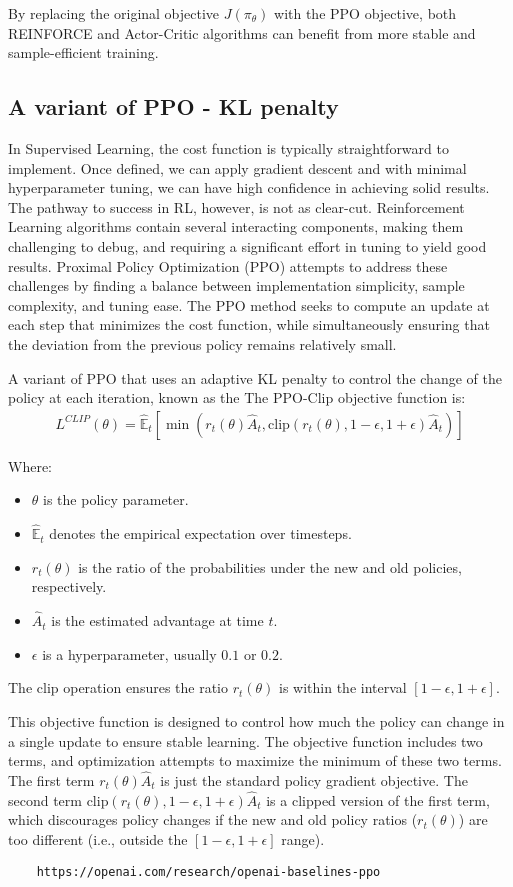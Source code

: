 By replacing the original objective $J(\pi_{\theta})$ with the PPO objective, both REINFORCE and Actor-Critic algorithms can benefit from more stable and sample-efficient training.

\subsection{A variant of PPO - KL penalty }
In Supervised Learning, the cost function is typically straightforward to implement. Once defined, we can apply gradient descent and with minimal hyperparameter tuning, we can have high confidence in achieving solid results. The pathway to success in RL, however, is not as clear-cut. Reinforcement Learning algorithms contain several interacting components, making them challenging to debug, and requiring a significant effort in tuning to yield good results. Proximal Policy Optimization (PPO) attempts to address these challenges by finding a balance between implementation simplicity, sample complexity, and tuning ease. The PPO method seeks to compute an update at each step that minimizes the cost function, while simultaneously ensuring that the deviation from the previous policy remains relatively small.

A variant of PPO that uses an adaptive KL penalty to control the change of the policy at each iteration, known as the The PPO-Clip objective function is:
\begin{align*}
L^{CLIP}(\theta) = \hat{\mathbb{E}}_t \left[ \min \left( r_t(\theta) \hat{A}_t, \text{clip}(r_t(\theta), 1-\epsilon, 1+\epsilon) \hat{A}_t \right) \right]
\end{align*}

Where:
\begin{itemize}
    \item $\theta$ is the policy parameter.
    \item $\hat{\mathbb{E}}_t$ denotes the empirical expectation over timesteps.
    \item $r_t(\theta)$ is the ratio of the probabilities under the new and old policies, respectively.
    \item $\hat{A}_t$ is the estimated advantage at time $t$.
    \item $\epsilon$ is a hyperparameter, usually $0.1$ or $0.2$.
\end{itemize}
The clip operation ensures the ratio $r_t(\theta)$ is within the interval $[1-\epsilon, 1+\epsilon]$.

This objective function is designed to control how much the policy can change in a single update to ensure stable learning. The objective function includes two terms, and optimization attempts to maximize the minimum of these two terms. The first term $r_t(\theta) \hat{A}_t$ is just the standard policy gradient objective. The second term $\text{clip}(r_t(\theta), 1-\epsilon, 1+\epsilon) \hat{A}_t$ is a clipped version of the first term, which discourages policy changes if the new and old policy ratios ($r_t(\theta)$) are too different (i.e., outside the $[1-\epsilon, 1+\epsilon]$ range).
\begin{verbatim}
    https://openai.com/research/openai-baselines-ppo
\end{verbatim}